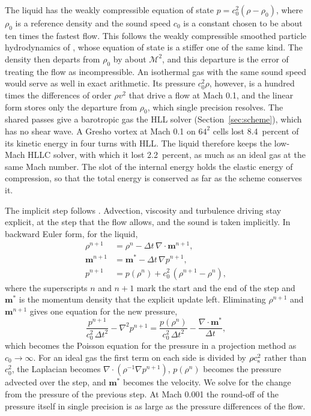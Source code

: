 \documentclass[twocolumn]{aastex701}
\begin{document}
The liquid has the weakly compressible equation of state $p = c_0^2(\rho - \rho_0)$, where $\rho_0$ is a reference density and the sound speed $c_0$ is a constant chosen to be about ten times the fastest flow. This follows the weakly compressible smoothed particle hydrodynamics of \citet{Monaghan1994}, whose equation of state is a stiffer one of the same kind. The density then departs from $\rho_0$ by about $\mathcal{M}^2$, and this departure is the error of treating the flow as incompressible. An isothermal gas with the same sound speed would serve as well in exact arithmetic. Its pressure $c_0^2\rho$, however, is a hundred times the differences of order $\rho v^2$ that drive a flow at Mach 0.1, and the linear form stores only the departure from $\rho_0$, which single precision resolves. The shared passes give a barotropic gas the HLL solver (Section~\ref{sec:scheme}), which has no shear wave. A Gresho vortex at Mach 0.1 on $64^2$ cells lost 8.4~percent of its kinetic energy in four turns with HLL. The liquid therefore keeps the low-Mach HLLC solver, with which it lost 2.2~percent, as much as an ideal gas at the same Mach number. The slot of the internal energy holds the elastic energy of compression, so that the total energy is conserved as far as the scheme conserves it.

The implicit step follows \citet{Kwatra2009}. Advection, viscosity and turbulence driving stay explicit, at the step that the flow allows, and the sound is taken implicitly. In backward Euler form, for the liquid,
\begin{equation}
\begin{aligned}
\rho^{n+1} &= \rho^n - \Delta t\,\nabla\cdot\mathbf{m}^{n+1},\\
\mathbf{m}^{n+1} &= \mathbf{m}^* - \Delta t\,\nabla p^{n+1},\\
p^{n+1} &= p(\rho^n) + c_0^2\,(\rho^{n+1} - \rho^n),
\end{aligned}
\label{eq:implicit}
\end{equation}
where the superscripts $n$ and $n+1$ mark the start and the end of the step and $\mathbf{m}^*$ is the momentum density that the explicit update left. Eliminating $\rho^{n+1}$ and $\mathbf{m}^{n+1}$ gives one equation for the new pressure,
\begin{equation}
\frac{p^{n+1}}{c_0^2\,\Delta t^2} - \nabla^2 p^{n+1} = \frac{p(\rho^n)}{c_0^2\,\Delta t^2} - \frac{\nabla\cdot\mathbf{m}^*}{\Delta t},
\label{eq:helmholtz}
\end{equation}
which becomes the Poisson equation for the pressure in a projection method \citep{Bell1989} as $c_0 \to \infty$. For an ideal gas the first term on each side is divided by $\rho c_{\rm s}^2$ rather than $c_0^2$, the Laplacian becomes $\nabla\cdot(\rho^{-1}\nabla p^{n+1})$, $p(\rho^n)$ becomes the pressure advected over the step, and $\mathbf{m}^*$ becomes the velocity. We solve for the change from the pressure of the previous step. At Mach 0.001 the round-off of the pressure itself in single precision is as large as the pressure differences of the flow.
\end{document}
